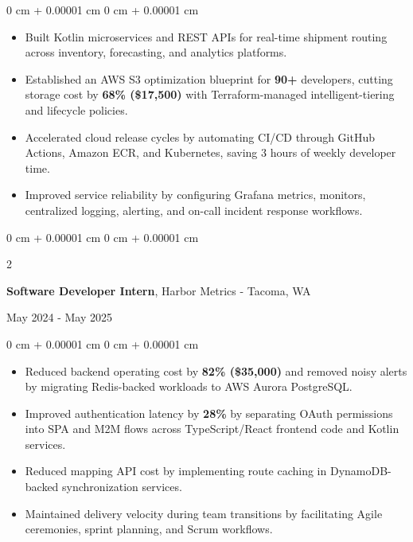 \documentclass[10pt, letterpaper]{article}
\newenvironment{onecolentry}{
    \begin{adjustwidth}{
        0 cm + 0.00001 cm
    }{
        0 cm + 0.00001 cm
    }
}{
    \end{adjustwidth}
}
\newenvironment{twocolentry}[2][]{
    \onecolentry
    \def\secondColumn{#2}
    \setcolumnwidth{\fill, 6 cm}
    \begin{paracol}{2}
}{
    \switchcolumn \raggedleft \secondColumn
    \end{paracol}
    \endonecolentry
}
\begin{document}
    \vspace{0.10 cm}
    \begin{onecolentry}
        \begin{itemize}[leftmargin=2em, itemsep=1pt, parsep=0pt, topsep=0pt, partopsep=0pt]
            \item Built Kotlin microservices and REST APIs for real-time shipment routing across inventory, forecasting, and analytics platforms.
            \item Established an AWS S3 optimization blueprint for \textbf{90+} developers, cutting storage cost by \textbf{68\% (\$17,500)} with Terraform-managed intelligent-tiering and lifecycle policies.
            \item Accelerated cloud release cycles by automating CI/CD through GitHub Actions, Amazon ECR, and Kubernetes, saving 3 hours of weekly developer time.
            \item Improved service reliability by configuring Grafana metrics, monitors, centralized logging, alerting, and on-call incident response workflows.
        \end{itemize}
    \end{onecolentry}

    \vspace{0.10 cm}

    \begin{twocolentry}{May 2024 - May 2025}
        \textbf{Software Developer Intern}, Harbor Metrics - Tacoma, WA
    \end{twocolentry}

    \vspace{0.10 cm}
    \begin{onecolentry}
        \begin{itemize}[leftmargin=2em, itemsep=1pt, parsep=0pt, topsep=0pt, partopsep=0pt]
            \item Reduced backend operating cost by \textbf{82\% (\$35,000)} and removed noisy alerts by migrating Redis-backed workloads to AWS Aurora PostgreSQL.
            \item Improved authentication latency by \textbf{28\%} by separating OAuth permissions into SPA and M2M flows across TypeScript/React frontend code and Kotlin services.
            \item Reduced mapping API cost by implementing route caching in DynamoDB-backed synchronization services.
            \item Maintained delivery velocity during team transitions by facilitating Agile ceremonies, sprint planning, and Scrum workflows.
        \end{itemize}
    \end{onecolentry}
\end{document}
